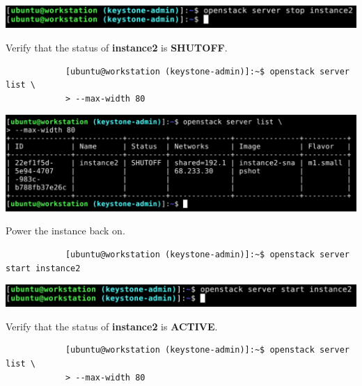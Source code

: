 \documentclass[letterpaper, 12pt]{article}
\begin{document}
\begin{enumerate}
\begin{labstep}
        \begin{center}
            \includegraphics[width=\linewidth]{images/part4/step17.png}
        \end{center}
    \end{labstep}

    \begin{labstep}
        Verify that the status of \textbf{instance2} is \textbf{SHUTOFF}.
        \begin{lstlisting}
            [ubuntu@workstation (keystone-admin)]:~$ openstack server list \
            > --max-width 80
        \end{lstlisting}

        \begin{center}
            \includegraphics[width=\linewidth]{images/part4/step18.png}
        \end{center}
    \end{labstep}

    \begin{labstep}
        Power the instance back on.
        \begin{lstlisting}
            [ubuntu@workstation (keystone-admin)]:~$ openstack server start instance2
        \end{lstlisting}

        \begin{center}
            \includegraphics[width=\linewidth]{images/part4/step19.png}
        \end{center}
    \end{labstep}

    \begin{labstep}
        Verify that the status of \textbf{instance2} is \textbf{ACTIVE}.
        \begin{lstlisting}
            [ubuntu@workstation (keystone-admin)]:~$ openstack server list \
            > --max-width 80
        \end{lstlisting}


\end{labstep}
\end{enumerate}
\end{document}
